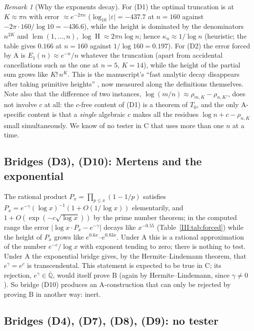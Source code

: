 \documentclass[11pt,a4paper]{article}
\newcommand{\Qbar}{\overline{\mathbb Q}}
\newcommand{\Tz}{T_0}
\DeclareMathOperator{\Ht}{H}
\theoremstyle{definition}
\theoremstyle{remark}
\newtheorem{remark}[theorem]{Remark}
\numberwithin{equation}{section}
\begin{document}
\begin{remark}[Why the exponents decay]\label{III:rem:decay}
For (D1) the optimal truncation is at $K\approx\pi n$ with error $\approx e^{-2\pi n}$
($\log_{10}|\varepsilon|=-437.7$ at $n=160$ against $-2\pi\cdot160/\log10=-436.6$), while
the height is dominated by the denominators $n^{2K}$ and $\operatorname{lcm}(1,\dots,n)$,
$\log\Ht\approx2\pi n\log n$; hence $\kappa_n\approx1/\log n$ (heuristic; the table gives
$0.166$ at $n=160$ against $1/\log160=0.197$). For (D2) the error forced by $\mathrm A$ is
$E_1(n)\approx e^{-n}/n$ whatever the truncation (apart from accidental cancellations
such as the one at $n=5$, $K=14$), while the height of the partial sum grows like
$K!\,n^K$. This is the manuscript's ``fast analytic decay disappears after
taking primitive heights'' \cite{M}, now measured along the definitions themselves. Note
also that the difference of two instances, $\log(m/n)\approx\rho_{m,K}-\rho_{n,K'}$, does
not involve $c$ at all: the $c$-free content of (D1) is a theorem of $\Tz$, and the only
$\mathrm A$-specific content is that a \emph{single} algebraic $c$ makes all the
residues $\log n+c-\rho_{n,K}$ small simultaneously. We know of no tester in $\mathrm C$
that uses more than one $n$ at a time.
\end{remark}

\subsection{Bridges (D3), (D10): Mertens and the exponential}

The rational product $P_x=\prod_{p\le x}(1-1/p)$ satisfies
$P_x=e^{-\gamma}(\log x)^{-1}(1+O(1/\log x))$ elementarily, and
$1+O(\exp(-c\sqrt{\log x}))$ by the prime number theorem; in the computed range the error
$|\log x\cdot P_x-e^{-\gamma}|$ decays like $x^{-0.55}$ (Table~\ref{III:tab:forced}) while
the height of $P_x$ grows like $e^{0.6x}$--$e^{0.83x}$. Under $\mathrm A$ this is a
rational approximation of the number $e^{-c}/\log x$ with exponent tending to zero;
there is nothing to test. Under $\mathrm A$ the
exponential bridge gives, by the Hermite--Lindemann theorem, that $e^{\gamma}=e^{c}$ is
transcendental. This statement is expected to be true in $\mathrm C$; its rejection,
$e^\gamma\in\Qbar$, would itself prove $\mathrm B$ (again by Hermite--Lindemann, since
$\gamma\ne0$). So bridge (D10) produces an $\mathrm A$-construction that can only be
rejected by proving $\mathrm B$ in another way: inert.

\subsection{Bridges (D4), (D7), (D8), (D9): no tester}
\end{document}
